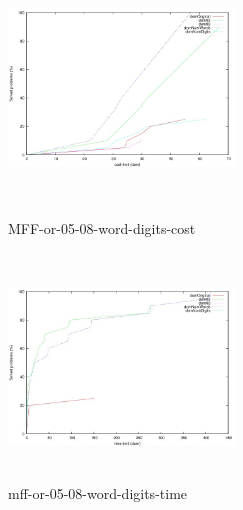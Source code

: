 \documentclass{article}
\begin{document}
\pagebreak

\begin{figure}[!htb]
   \begin{minipage}{0.48\textwidth}
     \centering
     \includegraphics[width=6cm, height=6cm]{mff-or-05-08-word-digits-cost}
    \caption{MFF-or-05-08-word-digits-cost}
   \end{minipage}\hfill
   \begin {minipage}{0.48\textwidth}
     \centering
     \includegraphics[width=6cm, height=6cm]{mff-or-05-08-word-digits-time}
    \caption{mff-or-05-08-word-digits-time}
   \end{minipage}
\end{figure}
\end{document}
